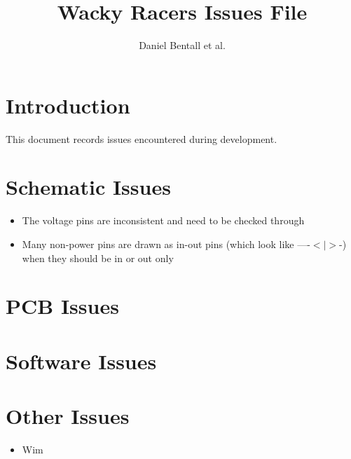\documentclass[10pt]{article}
\begin{document}
\title{Wacky Racers Issues File}
\author{Daniel Bentall et al.}
\maketitle

\section{Introduction}
This document records issues encountered during development. 

\section{Schematic Issues}
\begin{itemize}
\item The voltage pins are inconsistent and need to be checked through
\item Many non-power pins are drawn as in-out pins (which look like ----$<|>$-) when they should be in or out only
\end{itemize}

\section{PCB Issues}

\section{Software Issues}

\section{Other Issues}

\begin{itemize}
\item Wim
\end{itemize}
\end{document}
